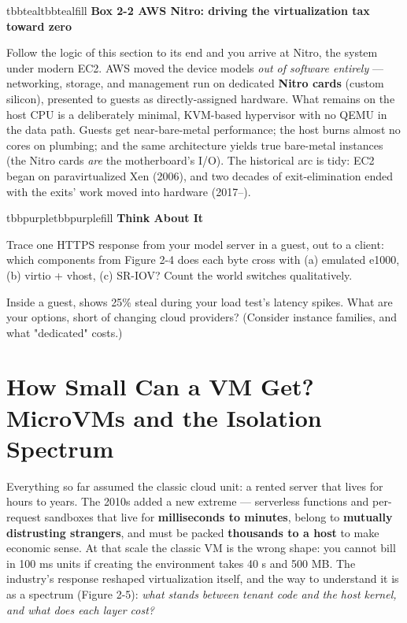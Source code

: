 \begin{calloutbox}{tbbteal}{tbbtealfill}
{\normalsize\bfseries\color{tbbx115E59}Box 2-2  AWS Nitro: driving the virtualization tax toward zero}\par\vspace{3pt}
Follow the logic of this section to its end and you arrive at Nitro, the system under modern EC2. AWS moved the device models \textit{out of software entirely} — networking, storage, and management run on dedicated \textbf{Nitro cards} (custom silicon), presented to guests as directly-assigned hardware. What remains on the host CPU is a deliberately minimal, KVM-based hypervisor with no QEMU in the data path. Guests get near-bare-metal performance; the host burns almost no cores on plumbing; and the same architecture yields true bare-metal instances (the Nitro cards \textit{are} the motherboard's I/O). The historical arc is tidy: EC2 began on paravirtualized Xen (2006), and two decades of exit-elimination ended with the exits' work moved into hardware (2017–).
\end{calloutbox}

\vspace{3.0pt}

\begin{calloutbox}{tbbpurple}{tbbpurplefill}
{\normalsize\bfseries\color{tbbpurple}Think About It}\par\vspace{3pt}
\begin{tbbitemize}
  \item Trace one HTTPS response from your model server in a guest, out to a client: which components from Figure 2-4 does each byte cross with (a) emulated e1000, (b) virtio + vhost, (c) SR-IOV? Count the world switches qualitatively.
  \item Inside a guest,  shows 25\% steal during your load test's latency spikes. What are your options, short of changing cloud providers? (Consider instance families, and what "dedicated" costs.)
\end{tbbitemize}
\end{calloutbox}

\section{How Small Can a VM Get? MicroVMs and the Isolation Spectrum}

Everything so far assumed the classic cloud unit: a rented server that lives for hours to years. The 2010s added a new extreme — serverless functions and per-request sandboxes that live for \textbf{milliseconds to minutes}, belong to \textbf{mutually distrusting strangers}, and must be packed \textbf{thousands to a host} to make economic sense. At that scale the classic VM is the wrong shape: you cannot bill in 100 ms units if creating the environment takes 40 s and 500 MB. The industry's response reshaped virtualization itself, and the way to understand it is as a spectrum (Figure 2-5): \textit{what stands between tenant code and the host kernel, and what does each layer cost?}


